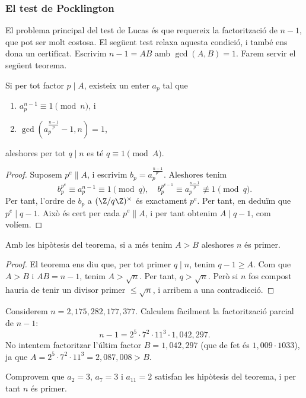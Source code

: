 \subsubsection{El test de Pocklington}
El problema principal del test de Lucas és que requereix la factorització de $n-1$, que pot ser molt costosa. El següent test relaxa aquesta condició, i també ens dona un certificat. Escrivim $n-1=AB$ amb $\gcd(A,B)=1$. Farem servir el següent teorema.
\begin{theorem}[Pocklington]
Si per tot factor $p\mid A$, existeix un enter $a_p$ tal que
\begin{enumerate}
    \item $a_p^{n-1}\equiv 1 \pmod n$, i
    \item $\gcd(a_p^\frac{n-1}{p} -1, n)=1$,
\end{enumerate}
aleshores per tot $q\mid n$ es té $q\equiv 1 \pmod{A}$.
\end{theorem}
\begin{proof}
Suposem $p^e\parallel A$, i escrivim $b_p=a_p^\frac{n-1}{p^e}$. Aleshores tenim
\[
b_p^{p^e} \equiv a_p^{n-1}\equiv 1\pmod q,\quad b_p^{p^{e-1}}\equiv a_p^\frac{n-1}{p} \not\equiv 1 \pmod q.
\]
Per tant, l'ordre de $b_p$ a $(\Z/q\Z)^\times$ és exactament $p^e$. Per tant, en deduïm que $p^e\mid q-1$. Això és cert per cada $p^e\parallel A$, i per tant obtenim $A\mid q-1$, com volíem.
\end{proof}
\begin{corollary}
Amb les hipòtesis del teorema, si a més tenim $A>B$ aleshores $n$ és primer.
\end{corollary}
\begin{proof}
El teorema ens diu que, per tot primer $q\mid n$, tenim $q-1\geq A$. Com que $A> B$ i $AB=n-1$, tenim $A>\sqrt{n}$. Per tant, $q>\sqrt{n}$. Però si $n$ fos compost hauria de tenir un divisor primer $\leq\sqrt{n}$, i arribem a una contradicció.
\end{proof}

\begin{example}
Considerem $n=2,175,282,177,377$. Calculem fàcilment la factorització parcial de $n-1$:
\[
n-1 = 2^5 \cdot 7^2 \cdot 11^3 \cdot 1,042,297.
\]
No intentem factoritzar l'últim factor $B=1,042,297$ (que de fet és $1,009 \cdot 1033$), ja que $A=2^5\cdot 7^2\cdot 11^3 = 2,087,008 > B$.

Comprovem que $a_2=3$, $a_7=3$ i $a_{11}=2$ satisfan les hipòtesis del teorema, i per tant $n$ és primer.
\end{example}

